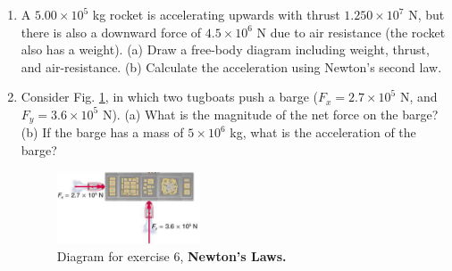 \documentclass[10pt]{article}
\begin{document}
\begin{enumerate}
\item A $5.00\times 10^5$ kg rocket is accelerating upwards with thrust $1.250\times 10^7$ N, but there is also a downward force of $4.5\times 10^6$ N due to air resistance (the rocket also has a weight). (a) Draw a free-body diagram including weight, thrust, and air-resistance.  (b) Calculate the acceleration using Newton's second law. \\ \vspace{2.0cm}
\item Consider Fig. \ref{fig:tug}, in which two tugboats push a barge ($F_x = 2.7\times 10^5$ N, and $F_y = 3.6\times 10^5$ N).  (a) What is the magnitude of the net force on the barge? (b) If the barge has a mass of $5\times 10^6$ kg, what is the acceleration of the barge? \vspace{2.0cm}
\begin{figure}
\centering
\includegraphics[width=0.4\textwidth]{figures/tug.png}
\caption{\label{fig:tug} Diagram for exercise 6, \textbf{Newton's Laws.}}
\end{figure}
\end{enumerate}
\end{document}
